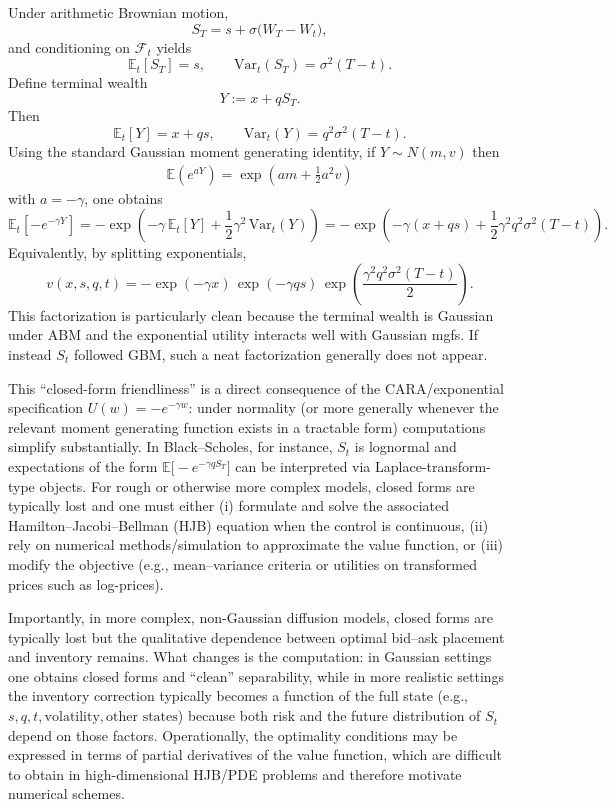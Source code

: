 \documentclass[a4paper,10pt,titlepage,oneside,openany]{book}
\theoremstyle{plain}\newtheorem{theorem}{Theorem}[chapter]
\theoremstyle{definition}\newtheorem{definition}{Definition}[chapter]
\theoremstyle{remark}\newtheorem{remark}{Remark}[chapter]
\begin{document}
Under arithmetic Brownian motion,
\[
S_T = s + \sigma\bigl(W_T-W_t\bigr),
\]
and conditioning on $\mathcal{F}_t$ yields
\[
\mathbb{E}_t[S_T]=s,
\qquad
\mathrm{Var}_t(S_T)=\sigma^2(T-t).
\]
Define terminal wealth
\[
Y:=x+qS_T.
\]
Then
\[
\mathbb{E}_t[Y]=x+qs,
\qquad
\mathrm{Var}_t(Y)=q^2\sigma^2(T-t).
\]
Using the standard Gaussian moment generating identity, if $Y\sim N(m,v)$ then 
\begin{align*}
    \mathbb{E}(e^{aY})=\exp(am+\tfrac12a^2v)
\end{align*}
with $a=-\gamma$, one obtains
\[
\mathbb{E}_t\!\left[-e^{-\gamma Y}\right]
=
-\exp\!\left(
-\gamma\,\mathbb{E}_t[Y]
+\frac12\gamma^2\,\mathrm{Var}_t(Y)
\right)
=
-\exp\!\left(
-\gamma(x+qs)
+\frac12\gamma^2 q^2\sigma^2(T-t)
\right).
\]
Equivalently, by splitting exponentials,
\[
v(x,s,q,t)
=
-\exp(-\gamma x)\,
\exp(-\gamma q s)\,
\exp\!\left(\frac{\gamma^2 q^2 \sigma^2 (T-t)}{2}\right).
\]
This factorization is particularly clean because the terminal wealth is Gaussian under ABM and the exponential utility interacts well with Gaussian mgfs. If instead $S_t$ followed GBM, such a neat factorization generally does not appear.

This ``closed-form friendliness'' is a direct consequence of the CARA/exponential specification $U(w)=-e^{-\gamma w}$: under normality (or more generally whenever the relevant moment generating function exists in a tractable form) computations simplify substantially. In Black--Scholes, for instance, $S_t$ is lognormal and expectations of the form $\mathbb{E}\bigl[-e^{-\gamma q S_T}\bigr]$ can be interpreted via Laplace-transform-type objects. For rough or otherwise more complex models, closed forms are typically lost and one must either (i) formulate and solve the associated Hamilton--Jacobi--Bellman (HJB) equation when the control is continuous, (ii) rely on numerical methods/simulation to approximate the value function, or (iii) modify the objective (e.g., mean--variance criteria or utilities on transformed prices such as log-prices).

Importantly, in more complex, non-Gaussian diffusion models, closed forms are typically lost but the qualitative dependence between optimal bid--ask placement and inventory remains. What changes is the computation: in Gaussian settings one obtains closed forms and ``clean'' separability, while in more realistic settings the inventory correction typically becomes a function of the full state (e.g., $s,q,t,\text{volatility},\text{other states}$) because both risk and the future distribution of $S_t$ depend on those factors. Operationally, the optimality conditions may be expressed in terms of partial derivatives of the value function, which are difficult to obtain in high-dimensional HJB/PDE problems and therefore motivate numerical schemes.
\end{document}
